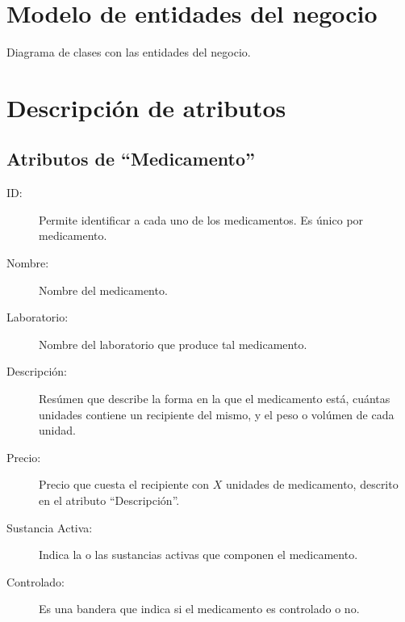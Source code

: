 

\section{Modelo de entidades del negocio}

Diagrama de clases con las entidades del negocio.


\section{Descripción de atributos}

\subsection{Atributos de ``Medicamento''}

\begin{description}
	\item[ID: ] Permite identificar a cada uno de los medicamentos. Es \'unico por medicamento.
	\item[Nombre: ] Nombre del medicamento.
	\item[Laboratorio: ] Nombre del laboratorio que produce tal medicamento.
	\item[Descripci\'on: ] Res\'umen que describe la forma en la que el medicamento est\'a, cu\'antas unidades contiene un recipiente del mismo, y el peso o vol\'umen de cada unidad.
	\item[Precio: ] Precio que cuesta el recipiente con $X$ unidades de medicamento, descrito en el atributo "`Descripci\'on"'.
	\item[Sustancia Activa: ] Indica la o las sustancias activas que componen el medicamento. 
	\item[Controlado: ] Es una bandera que indica si el medicamento es controlado o no.
\end{description}

